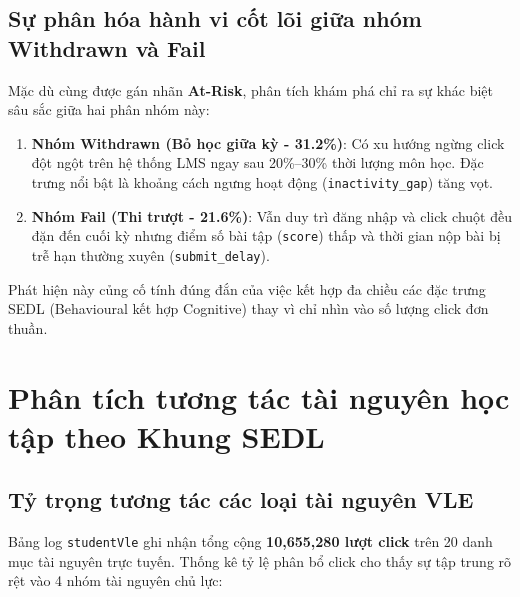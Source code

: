 \documentclass[11pt,a4paper]{article}
\begin{document}
\subsection{Sự phân hóa hành vi cốt lõi giữa nhóm Withdrawn và Fail}

Mặc dù cùng được gán nhãn \textbf{At-Risk}, phân tích khám phá chỉ ra sự khác biệt sâu sắc giữa hai phân nhóm này:
\begin{enumerate}
    \item \textbf{Nhóm Withdrawn (Bỏ học giữa kỳ - 31.2\%)}: Có xu hướng ngừng click đột ngột trên hệ thống LMS ngay sau 20\%--30\% thời lượng môn học. Đặc trưng nổi bật là khoảng cách ngưng hoạt động (\texttt{inactivity\_gap}) tăng vọt.
    \item \textbf{Nhóm Fail (Thi trượt - 21.6\%)}: Vẫn duy trì đăng nhập và click chuột đều đặn đến cuối kỳ nhưng điểm số bài tập (\texttt{score}) thấp và thời gian nộp bài bị trễ hạn thường xuyên (\texttt{submit\_delay}).
\end{enumerate}
Phát hiện này củng cố tính đúng đắn của việc kết hợp đa chiều các đặc trưng SEDL (Behavioural kết hợp Cognitive) thay vì chỉ nhìn vào số lượng click đơn thuần.

\newpage

\section{Phân tích tương tác tài nguyên học tập theo Khung SEDL}

\subsection{Tỷ trọng tương tác các loại tài nguyên VLE}
Bảng log \texttt{studentVle} ghi nhận tổng cộng \textbf{10,655,280 lượt click} trên 20 danh mục tài nguyên trực tuyến. Thống kê tỷ lệ phân bổ click cho thấy sự tập trung rõ rệt vào 4 nhóm tài nguyên chủ lực:
\end{document}
